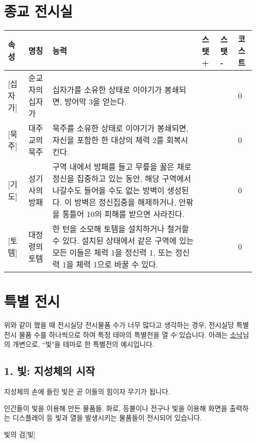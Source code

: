 \documentclass{report}
\begin{document}
	\section*{종교 전시실}
	\begin{tabularx}{\textwidth}{l!{\color{black}\vrule}l!{\color{black}\vrule}X!{\color{black}\vrule}l!{\color{black}\vrule}l!{\color{black}\vrule}l}
		\textbf{속성} & \textbf{명칭} & \textbf{능력} & \textbf{스탯 +} & \textbf{스탯 -} & \textbf{코스트}\\ \hline \hline
		[신성][십자가]& 순교자의 십자가 & 십자가를 소유한 상태로 이야기가 봉쇄되면, 방어막 3을 얻는다. &  & & 0 \\ \hline
		[신성][묵주]& 대주교의 묵주 & 묵주를 소유한 상태로 이야기가 봉쇄되면, 자신을 포함한 한 대상의 체력 2를 회복시킨다. &  & & 0 \\ \hline
		[신성][기도]& 성기사의 방패 & 구역 내에서 방패를 들고 무릎을 꿇은 채로 정신을 집중하고 있는 동안, 해당 구역에서 나갈수도 들어올 수도 없는 방벽이 생성된다. 이 방벽은 정신집중을 해제하거나, 안팎을 통틀어 10의 피해를 받으면 사라진다.  &  & & 0 \\ \hline
		[신성][토템]& 대정령의 토템 & 한 턴을 소모해 토템을 설치하거나 철거할 수 있다. 설치된 상태에서 같은 구역에 있는 모든 이들은 체력 1을 정신력 1, 또는 정신력 1을 체력 1으로 바꿀 수 있다. &  & & 0 \\
	\end{tabularx}
	
	\section{특별 전시}
	위와 같이 했을 때 전시실당 전시물품 수가 너무 많다고 생각하는 경우, 전시실당 특별 전시 물품 수를 하나씩으로 하여 특정 테마의 특별전을 열 수 있습니다. 아래는 \href{https://twitter.com/knock_tr}{소낙}님의 개변으로, ``빛"을 테마로 한 특별전의 예시입니다.
	
	\subsection*{1. 빛: 지성체의 시작}
	{\storyfont\Large 지성체의 손에 들린 빛은 곧 이들의 힘이자 무기가 됩니다.}
	
	인간들이 빛을 이용해 만든 물품들. 화로, 등불이나 전구나 빛을 이용해 화면을 출력하는 디스플레이 등 빛과 열을 발생시키는 물품들이 전시되어 있습니다.
	
	\begin{story}{빛의 검}{[빛]}
	\end{story}
	
\end{document}
